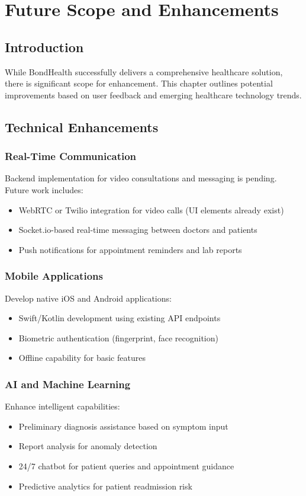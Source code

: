 \chapter{Future Scope and Enhancements}

\section{Introduction}
While BondHealth successfully delivers a comprehensive healthcare solution, there is significant scope for enhancement. This chapter outlines potential improvements based on user feedback and emerging healthcare technology trends.

\section{Technical Enhancements}

\subsection{Real-Time Communication}
Backend implementation for video consultations and messaging is pending. Future work includes:
\begin{itemize}
    \item WebRTC or Twilio integration for video calls (UI elements already exist)
    \item Socket.io-based real-time messaging between doctors and patients
    \item Push notifications for appointment reminders and lab reports
\end{itemize}

\subsection{Mobile Applications}
Develop native iOS and Android applications:
\begin{itemize}
    \item Swift/Kotlin development using existing API endpoints
    \item Biometric authentication (fingerprint, face recognition)
    \item Offline capability for basic features
\end{itemize}

\subsection{AI and Machine Learning}
Enhance intelligent capabilities:
\begin{itemize}
    \item Preliminary diagnosis assistance based on symptom input
    \item Report analysis for anomaly detection
    \item 24/7 chatbot for patient queries and appointment guidance
    \item Predictive analytics for patient readmission risk
\end{itemize}


